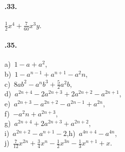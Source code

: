 \begin{multicols}{2}
\paragraph{\thechapter.33.} $\frac{1}{2}x^{4}+\frac{7}{60}x^{3}y$.
\paragraph{\thechapter.35.} a)~$1-a+a^{2}$,\protect\\ b)~$1-a^{n-1}+a^{n+1}-a^{2}n$,\protect\\ c)~$8ab^2-a^nb^3+\frac{5}{2}a^2b$, \protect \\
d)~$a^{2n+4}-2a^{2n+3}+2a^{2n+2}-a^{2n+1}$,\protect\\ e)~$a^{2n+3}-a^{2n+2}-a^{2n-1}+a^{2n}$,\protect\\ f)~$-a^{2}n+a^{2n+3}$,\quad
\protect\\ g)~$a^{2n+4}+2a^{2n+3}+a^{2n+2}$,\protect\\ i)~$a^{2n+2}-a^{n+1}-2$,\quad h)~$a^{4n+4}-a^{4n}$,\protect\\
j)~$\frac{7}{12}x^{2n}+\frac{3}{4}x^{n}-\frac{1}{2}x^{3n}-\frac{1}{3}x^{n+1}+x$.
\end{multicols}
